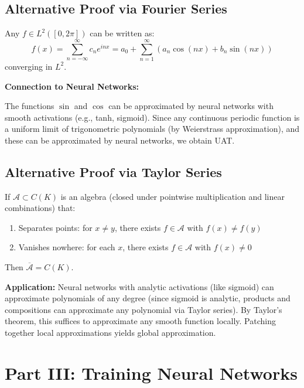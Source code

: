 \documentclass[main.tex]{subfiles}
\begin{document}
\subsection{Alternative Proof via Fourier Series}

\begin{theorem}
Any $f \in L^2([0, 2\pi])$ can be written as:
$$f(x) = \sum_{n=-\infty}^{\infty} c_n e^{inx} = a_0 + \sum_{n=1}^{\infty} (a_n \cos(nx) + b_n \sin(nx))$$
converging in $L^2$.
\end{theorem}

\textbf{Connection to Neural Networks:}

The functions $\sin$ and $\cos$ can be approximated by neural networks with smooth activations (e.g., tanh, sigmoid). Since any continuous periodic function is a uniform limit of trigonometric polynomials (by Weierstrass approximation), and these can be approximated by neural networks, we obtain UAT.

\subsection{Alternative Proof via Taylor Series}

\begin{theorem}
If $\mathcal{A} \subset C(K)$ is an algebra (closed under pointwise multiplication and linear combinations) that:
\begin{enumerate}
    \item Separates points: for $x \neq y$, there exists $f \in \mathcal{A}$ with $f(x) \neq f(y)$
    \item Vanishes nowhere: for each $x$, there exists $f \in \mathcal{A}$ with $f(x) \neq 0$
\end{enumerate}
Then $\overline{\mathcal{A}} = C(K)$.
\end{theorem}

\textbf{Application:} Neural networks with analytic activations (like sigmoid) can approximate polynomials of any degree (since sigmoid is analytic, products and compositions can approximate any polynomial via Taylor series). By Taylor's theorem, this suffices to approximate any smooth function locally. Patching together local approximations yields global approximation.

\newpage
\section*{\Huge\textcolor{mantis}{Part III: Training Neural Networks}}
\end{document}

